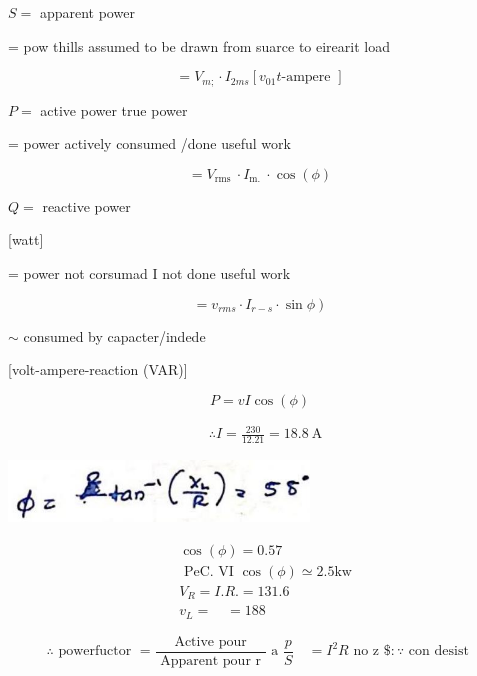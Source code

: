 \documentclass[12pt, a4paper]{article}
\newcommand{\figwidth}{8cm}
\begin{document}
$S=$ apparent power

	= pow thills assumed to be drawn from suarce to eirearit load

	$$
		=V_{m ;} \cdot I_{2 m s}\left[v_{01} t \text {-ampere }\right]
	$$

$P=$ active power true power

	= power actively consumed /done useful work

	$$
		=V_{\text {rms }} \cdot I_{\text {m. }} \cdot \cos (\phi)
	$$

$Q=$ reactive power

		[watt]

	= power not corsumad I not done useful work

	$$
		\left.=v_{r m s} \cdot I_{r-s} \cdot \sin \phi\right)
	$$

$\sim$ consumed by capacter/indede

	[volt-ampere-reaction (VAR)]

	$$
		P=v I \cos (\phi)
	$$

	$$
		\begin{aligned}
			 & \therefore I=\frac{230}{12.21}=18.8 \mathrm{~A}
		\end{aligned}
	$$

	\begin{center}
		\includegraphics[max width=\figwidth]{2024_06_15_74bbabba7981675b0d49g-07(1)}
	\end{center}

	$$
		\begin{aligned}
			 & \cos (\phi)=0.57                                     \\
			 & \text { PeC. VI } \cos (\phi) \simeq 2.5 \mathrm{kw} \\
			 & V_{R}=I . R .=131.6                                  \\
			 & v_{L}=\quad=188
		\end{aligned}
	$$

	$$
		\therefore \text { powerfuctor }=\frac{\text { Active pour }}{\text { Apparent pour r }} \text { a } \frac{p}{S} \quad=I^{2} R \text { no z } \$: \because \text { con desist }
	$$
\end{document}
